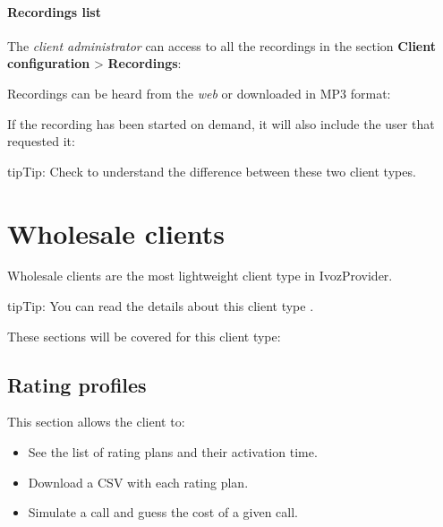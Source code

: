 \documentclass[letterpaper,10pt,english]{sphinxmanual}
\begin{document}
\paragraph{Recordings list}
\label{administration_portal/client/retail/calls/call_recordings:recordings-list}
The \emph{client administrator} can access to all the recordings in the section
\textbf{Client configuration} \textgreater{} \textbf{Recordings}:

Recordings can be heard from the \emph{web} or downloaded in MP3 format:

If the recording has been started on demand, it will also include the user
that requested it:

\begin{notice}{tip}{Tip:}
Check {\hyperref[administration_portal/brand/clients/retail:differences\string-between\string-retail\string-and\string-residential\string-clients]{}} to understand the difference between these two
client types.
\end{notice}


\section{Wholesale clients}
\label{administration_portal/client/wholesale/index:wholesale-clients}\label{administration_portal/client/wholesale/index::doc}
Wholesale clients are the most lightweight client type in IvozProvider.

\begin{notice}{tip}{Tip:}
You can read the details about this client type {\hyperref[administration_portal/brand/clients/wholesale:wholesale\string-clients]{}}.
\end{notice}

These sections will be covered for this client type:


\subsection{Rating profiles}
\label{administration_portal/client/wholesale/rating_profiles:rating-profiles}\label{administration_portal/client/wholesale/rating_profiles::doc}
This section allows the client to:
\begin{itemize}
\item {} 
See the list of rating plans and their activation time.

\item {} 
Download a CSV with each rating plan.

\item {} 
Simulate a call and guess the cost of a given call.

\end{itemize}
\end{document}
